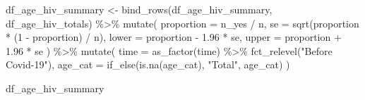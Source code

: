 \documentclass[
  letterpaper,
  DIV=11,
  numbers=noendperiod]{scrartcl}
\newenvironment{Shaded}{\begin{snugshade}}{\end{snugshade}}
\newcommand{\AttributeTok}[1]{\textcolor[rgb]{0.40,0.45,0.13}{#1}}
\newcommand{\DecValTok}[1]{\textcolor[rgb]{0.68,0.00,0.00}{#1}}
\newcommand{\FloatTok}[1]{\textcolor[rgb]{0.68,0.00,0.00}{#1}}
\newcommand{\FunctionTok}[1]{\textcolor[rgb]{0.28,0.35,0.67}{#1}}
\newcommand{\NormalTok}[1]{\textcolor[rgb]{0.00,0.23,0.31}{#1}}
\newcommand{\OtherTok}[1]{\textcolor[rgb]{0.00,0.23,0.31}{#1}}
\newcommand{\SpecialCharTok}[1]{\textcolor[rgb]{0.37,0.37,0.37}{#1}}
\newcommand{\StringTok}[1]{\textcolor[rgb]{0.13,0.47,0.30}{#1}}
\begin{document}
\begin{Shaded}
\begin{Highlighting}[]
\NormalTok{df\_age\_hiv\_summary }\OtherTok{\textless{}{-}} \FunctionTok{bind\_rows}\NormalTok{(df\_age\_hiv\_summary, df\_age\_hiv\_totals) }\SpecialCharTok{\%\textgreater{}\%}
  \FunctionTok{mutate}\NormalTok{(}
    \AttributeTok{proportion =}\NormalTok{ n\_yes }\SpecialCharTok{/}\NormalTok{ n,}
    \AttributeTok{se =} \FunctionTok{sqrt}\NormalTok{(proportion }\SpecialCharTok{*}\NormalTok{ (}\DecValTok{1} \SpecialCharTok{{-}}\NormalTok{ proportion) }\SpecialCharTok{/}\NormalTok{ n),}
    \AttributeTok{lower =}\NormalTok{ proportion }\SpecialCharTok{{-}} \FloatTok{1.96} \SpecialCharTok{*}\NormalTok{ se,}
    \AttributeTok{upper =}\NormalTok{ proportion }\SpecialCharTok{+} \FloatTok{1.96} \SpecialCharTok{*}\NormalTok{ se}
\NormalTok{  ) }\SpecialCharTok{\%\textgreater{}\%} 
  \FunctionTok{mutate}\NormalTok{(}
    \AttributeTok{time =} \FunctionTok{as\_factor}\NormalTok{(time) }\SpecialCharTok{\%\textgreater{}\%} 
      \FunctionTok{fct\_relevel}\NormalTok{(}\StringTok{"Before Covid{-}19"}\NormalTok{),}
    \AttributeTok{age\_cat =} \FunctionTok{if\_else}\NormalTok{(}\FunctionTok{is.na}\NormalTok{(age\_cat), }\StringTok{"Total"}\NormalTok{, age\_cat)}
\NormalTok{  )}

\NormalTok{df\_age\_hiv\_summary}
\end{Highlighting}
\end{Shaded}
\end{document}

